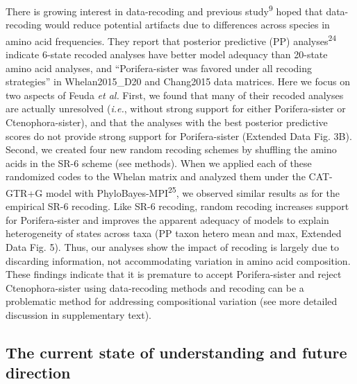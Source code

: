 \documentclass[]{article}
\begin{document}
There is growing interest in data-recoding and previous
study\textsuperscript{9} hoped that data-recoding would reduce potential
artifacts due to differences across species in amino acid frequencies.
They report that posterior predictive (PP) analyses\textsuperscript{24}
indicate 6-state recoded analyses have better model adequacy than
20-state amino acid analyses, and ``Porifera-sister was favored under
all recoding strategies'' in Whelan2015\_D20 and Chang2015 data
matrices. Here we focus on two aspects of Feuda \emph{et al.} First, we
found that many of their recoded analyses are actually unresolved
(\emph{i.e.}, without strong support for either Porifera-sister or
Ctenophora-sister), and that the analyses with the best posterior
predictive scores do not provide strong support for Porifera-sister
(Extended Data Fig. 3B). Second, we created four new random recoding
schemes by shuffling the amino acids in the SR-6 scheme (see methods).
When we applied each of these randomized codes to the Whelan matrix and
analyzed them under the CAT-GTR+G model with
PhyloBayes-MPI\textsuperscript{25}, we observed similar results as for
the empirical SR-6 recoding. Like SR-6 recoding, random recoding
increases support for Porifera-sister and improves the apparent adequacy
of models to explain heterogeneity of states across taxa (PP taxon
hetero mean and max, Extended Data Fig. 5). Thus, our analyses show the
impact of recoding is largely due to discarding information, not
accommodating variation in amino acid composition. These findings
indicate that it is premature to accept Porifera-sister and reject
Ctenophora-sister using data-recoding methods and recoding can be a
problematic method for addressing compositional variation (see more
detailed discussion in supplementary text).

\hypertarget{the-current-state-of-understanding-and-future-direction}{%
\subsection{The current state of understanding and future
direction}\label{the-current-state-of-understanding-and-future-direction}}
\end{document}
